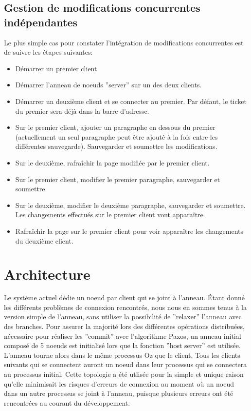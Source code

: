 \documentclass{article}
\begin{document}
	\subsection{Gestion de modifications concurrentes indépendantes}
	Le plus simple cas pour constater l'intégration de modifications concurrentes est de suivre les étapes suivantes:
	\begin{itemize}
		\item Démarrer un premier client
		\item Démarrer l'anneau de noeuds ''server'' sur un des deux clients.
		\item Démarrer un deuxième client et se connecter au premier.  Par défaut, le ticket
			du premier sera déjà dans la barre d'adresse.
		\item Sur le premier client, ajouter un paragraphe en dessous du premier (actuellement un 
			seul paragraphe peut être ajouté à la fois entre les différentes sauvegarde).
			Sauvegarder et soumettre les modifications.
		\item Sur le deuxième, rafraîchir la page modifiée par le premier client.
		\item Sur le premier client, modifier le premier paragraphe, sauvegarder et soumettre.
		\item Sur le deuxième, modifier le deuxième paragraphe, sauvegarder et soumettre. Les 
			changements effectués sur le premier client vont apparaître.
		\item Rafraîchir la page sur le premier client pour voir apparaître les changements du 
			deuxième client.	
	\end{itemize}
	
	\section{Architecture}
	Le système actuel dédie un noeud par client qui se joint à l'anneau.  Étant donné les différents 
	problèmes de connexion rencontrés, nous nous en sommes tenus à la version simple de l'anneau, 
	sans utiliser la possibilité de ''relaxer'' l'anneau avec des branches.  Pour assurer la majorité lors des
	différentes opérations distribuées, nécessaire pour réaliser les ''commit'' avec l'algorithme Paxos,
	un anneau initial composé de 5 noeuds est initialisé lors que la fonction ''host server'' est utilisée.
	L'anneau tourne alors dans le même processus Oz que le client.  Tous les clients suivants qui
	se connectent auront un noeud dans leur processus qui se connectera au processus initial.  Cette topologie
	a été utlisée pour la simple et unique raison qu'elle minimisait les risques d'erreurs de connexion au moment 
	où un noeud dans un autre processus se joint à l'anneau, puisque plusieurs erreurs ont été 
	rencontrées au courant du développement.
	
\end{document}
